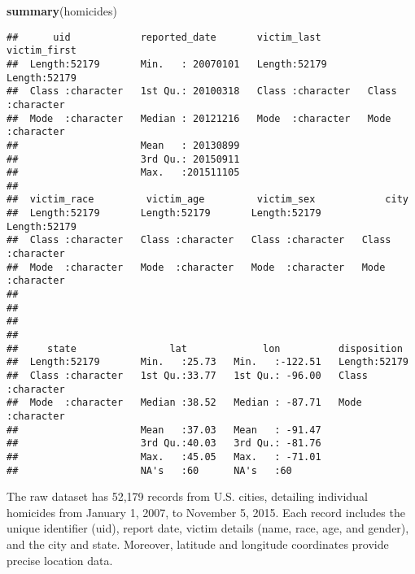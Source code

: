 \documentclass[
]{article}
\newenvironment{Shaded}{\begin{snugshade}}{\end{snugshade}}
\newcommand{\FunctionTok}[1]{\textcolor[rgb]{0.13,0.29,0.53}{\textbf{#1}}}
\newcommand{\NormalTok}[1]{#1}
\begin{document}
\begin{Shaded}
\begin{Highlighting}[]
\FunctionTok{summary}\NormalTok{(homicides)}
\end{Highlighting}
\end{Shaded}

\begin{verbatim}
##      uid            reported_date       victim_last        victim_first      
##  Length:52179       Min.   : 20070101   Length:52179       Length:52179      
##  Class :character   1st Qu.: 20100318   Class :character   Class :character  
##  Mode  :character   Median : 20121216   Mode  :character   Mode  :character  
##                     Mean   : 20130899                                        
##                     3rd Qu.: 20150911                                        
##                     Max.   :201511105                                        
##                                                                              
##  victim_race         victim_age         victim_sex            city          
##  Length:52179       Length:52179       Length:52179       Length:52179      
##  Class :character   Class :character   Class :character   Class :character  
##  Mode  :character   Mode  :character   Mode  :character   Mode  :character  
##                                                                             
##                                                                             
##                                                                             
##                                                                             
##     state                lat             lon          disposition       
##  Length:52179       Min.   :25.73   Min.   :-122.51   Length:52179      
##  Class :character   1st Qu.:33.77   1st Qu.: -96.00   Class :character  
##  Mode  :character   Median :38.52   Median : -87.71   Mode  :character  
##                     Mean   :37.03   Mean   : -91.47                     
##                     3rd Qu.:40.03   3rd Qu.: -81.76                     
##                     Max.   :45.05   Max.   : -71.01                     
##                     NA's   :60      NA's   :60
\end{verbatim}

The raw dataset has 52,179 records from U.S. cities, detailing
individual homicides from January 1, 2007, to November 5, 2015. Each
record includes the unique identifier (uid), report date, victim details
(name, race, age, and gender), and the city and state. Moreover,
latitude and longitude coordinates provide precise location data.
\end{document}
